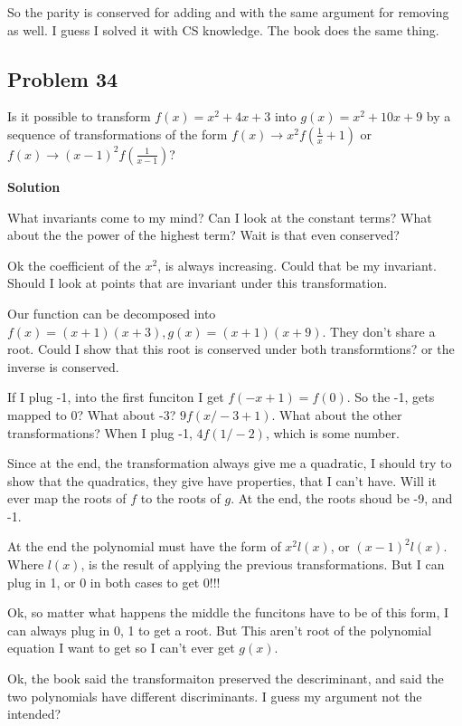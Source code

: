 \documentclass[12pt,tikz,border=10pt]{article}
\theoremstyle{definition}
\theoremstyle{remark}
\begin{document}
So the parity is conserved for adding and with the same argument for removing as well. I guess I solved 
it with CS knowledge. The book does the same thing.

\subsection{Problem 34}

Is it possible to transform $f(x)=x^2 +4x +3$ into $g(x)=x^2 +10x +9$ by a
sequence of transformations of the form
$f(x) \rightarrow x^2 f \left(\frac{1}{x} + 1\right)$ or $f(x) \rightarrow (x-1)^2 f \left(\frac{1}{x-1}\right)$?

\textbf{Solution}

What invariants come to my mind? Can I look at the constant terms?
What about the the power of the highest term? Wait is that even conserved?

Ok the coefficient of the $x^2$, is always increasing. Could that be my invariant.
Should I look at points that are invariant under this transformation.

Our function can be decomposed into $f(x)=(x+1)(x+3), g(x)=(x+1)(x+9)$. They don't 
share a root. Could I show that this root is conserved under both transformtions? or the inverse is conserved.

If I plug -1, into the first funciton I get $f(-x+1)=f(0)$. So the -1, gets mapped to 0?
What about -3? $9f(x/-3 + 1)$. What about the other transformations? When I plug -1, $4f(1/-2)$, which is some number.

Since at the end, the transformation always give me a quadratic, I should try to show that the 
quadratics, they give have properties, that I can't have. Will it ever map the roots of $f$ to the 
roots of $g$. At the end, the roots shoud be -9, and -1.

At the end the polynomial must have the form of $x^2l(x)$, or $(x-1)^2l(x)$. Where 
$l(x)$, is the result of applying the previous transformations. But I can plug in 1, or 0 in both cases to get 0!!!

Ok, so matter what happens the middle the funcitons have to be of this form, I can always plug in 0, 1 to get a root. But
This aren't root of the polynomial equation I want to get so I can't ever get $g(x)$.

Ok, the book said the transformaiton preserved the descriminant, and said the two polynomials have different discriminants.
I guess my argument not the intended?
\end{document}
